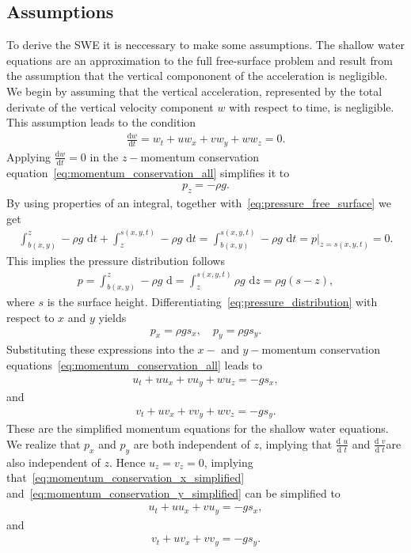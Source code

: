 \subsection{Assumptions}
To derive the SWE it is neccessary to make some assumptions. 
The shallow water equations are an approximation to the full free-surface problem and result from the assumption that the vertical compononent of the acceleration is negligible.
We begin by assuming that the vertical acceleration, represented by the total derivate of the vertical velocity component $w$ with respect to time, is negligible.
This assumption leads to the condition
\begin{align*}
    \frac{\text{d} w}{\text{d} t} = w_t + uw_x + vw_y + ww_z = 0.
\end{align*}
Applying $\frac{\text{d}w}{\text{d}t} = 0$ in the $z-$momentum conservation equation~\eqref{eq:momentum_conservation_all} simplifies it to
\begin{align*}
    p_z = -\rho g.
\end{align*}
By using properties of an integral, together with~\eqref{eq:pressure_free_surface} we get
\begin{align*}
    \int_{b(x,y)}^z - \rho g \text{ d}t + \int_z^{s(x,y,t)} - \rho g \text{ d}t = \int_{b(x,y)}^{s(x,y,t)} - \rho g \text{ d}t
    = p|_{z = s(x,y,t)} = 0.
\end{align*}
This implies the pressure distribution follows
\begin{align}\label{eq:pressure_distribution}
    p = \int_{b(x,y)}^z - \rho g \text{ d} = \int_z^{s(x,y,t)} \rho g \text{ d} z = \rho g (s - z),
\end{align}
where $s$ is the surface height.
Differentiating~\eqref{eq:pressure_distribution} with respect to $x$ and $y$ yields
\begin{align*}%
    p_x = \rho g s_x, \quad p_y = \rho g s_y.
\end{align*}
Substituting these expressions into the $x-$ and $y-$momentum conservation equations~\eqref{eq:momentum_conservation_all} leads to 
\begin{align}\label{eq:momentum_conservation_x_simplified}
    u_t + u u_x + v u_y + w u_z = -g s_x, 
\end{align}
and
\begin{align}\label{eq:momentum_conservation_y_simplified}
    v_t + u v_x + v v_y + w v_z = -g s_y.
\end{align}
These are the simplified momentum equations for the shallow water equations.
We realize that $p_x$ and $p_y$ are both independent of $z$, implying that $\frac{\text{d }u}{\text{d }t} $ and $\frac{\text{d }v}{\text{d }t} $are also independent of $z$.
Hence $u_z = v_z = 0$, implying that~\eqref{eq:momentum_conservation_x_simplified} and~\eqref{eq:momentum_conservation_y_simplified} can be simplified to
\begin{align}\label{eq:momentum_conservation_x_final}
    u_t + u u_x + v u_y = -g s_x, 
\end{align}
and
\begin{align}\label{eq:momentum_conservation_y_final}
    v_t + u v_x + v v_y = -g s_y.
\end{align}


